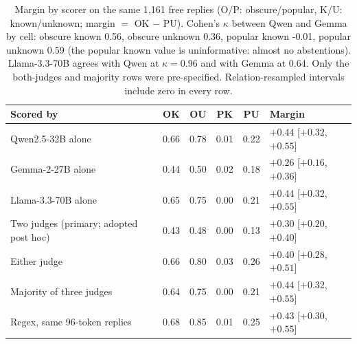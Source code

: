 \begin{table}[h]
\centering\footnotesize\setlength{\tabcolsep}{3pt}
\begin{tabular}{lccccl}
\toprule
Scored by & OK & OU & PK & PU & Margin \\
\midrule
Qwen2.5-32B alone & 0.66 & 0.78 & 0.01 & 0.22 & $+0.44$ [$+0.32$, $+0.55$] \\
Gemma-2-27B alone & 0.44 & 0.50 & 0.02 & 0.18 & $+0.26$ [$+0.16$, $+0.36$] \\
Llama-3.3-70B alone & 0.65 & 0.75 & 0.00 & 0.21 & $+0.44$ [$+0.32$, $+0.55$] \\
Two judges (primary; adopted post hoc) & 0.43 & 0.48 & 0.00 & 0.13 & $+0.30$ [$+0.20$, $+0.40$] \\
Either judge & 0.66 & 0.80 & 0.03 & 0.26 & $+0.40$ [$+0.28$, $+0.51$] \\
Majority of three judges & 0.64 & 0.75 & 0.00 & 0.21 & $+0.44$ [$+0.32$, $+0.55$] \\
Regex, same 96-token replies & 0.68 & 0.85 & 0.01 & 0.25 & $+0.43$ [$+0.30$, $+0.55$] \\
\bottomrule
\end{tabular}
\caption{Margin by scorer on the same 1,161 free replies (O/P: obscure/popular, K/U: known/unknown; margin $=$ OK $-$ PU). Cohen's $\kappa$ between Qwen and Gemma by cell: obscure known 0.56, obscure unknown 0.36, popular known -0.01, popular unknown 0.59 (the popular known value is uninformative: almost no abstentions). Llama-3.3-70B agrees with Qwen at $\kappa=0.96$ and with Gemma at 0.64. Only the both-judges and majority rows were pre-specified. Relation-resampled intervals include zero in every row.}
\label{tab:x0judges}
\end{table}

